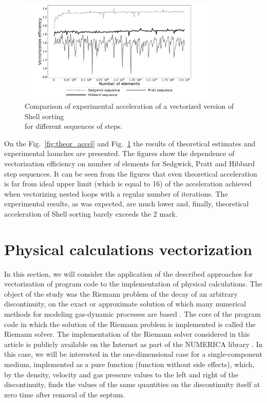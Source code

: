 \documentclass[
11pt,%
tightenlines,%
twoside,%
onecolumn,%
nofloats,%
nobibnotes,%
nofootinbib,%
superscriptaddress,%
noshowpacs,%
centertags]%
{revtex4}
\begin{document}
\begin{figure}[h]
\setcaptionmargin{5mm}
\onelinecaptionsfalse
\includegraphics[width=0.85\textwidth]{pics/theoretical_eff.pdf}
\caption{Comparison of experimental acceleration of a vectorized version of Shell sorting \\ for different sequences of steps.}\label{experim_accel}
\end{figure}

On the Fig.~\ref{fig:theor_accel} and Fig.~\ref{experim_accel} the results of theoretical estimates and experimental launches are presented. 
The figures show the dependence of vectorization efficiency on number of elements for Sedgwick, Pratt and Hibbard step sequences. 
It can be seen from the figures that even theoretical acceleration is far from ideal upper limit (which is equal to 16) of the acceleration achieved when vectorizing nested loops with a regular number of iterations.
The experimental results, as was expected, are much lower and, finally, theoretical acceleration of Shell sorting barely exceeds the  2 mark. 
        
\section{Physical calculations vectorization}

In this section, we will consider the application of the described approaches for vectorization of program code to the implementation of physical calculations.
The object of the study was the Riemann problem of the decay of an arbitrary discontinuity, on the exact or approximate solution of which many numerical methods for modeling gas-dynamic processes are based \cite{Toro}.
The core of the program code in which the solution of the Riemann problem is implemented is called the Riemann solver.
The implementation of the Riemann solver considered in this article is publicly available on the Internet as part of the NUMERICA library \cite{Numerica}.
In this case, we will be interested in the one-dimensional case for a single-component medium, implemented as a pure function (function without side effects), which, by the density, velocity and gas pressure values to the left and right of the discontinuity, finds the values of the same quantities on the discontinuity itself at zero time after removal of the septum.
\end{document}
